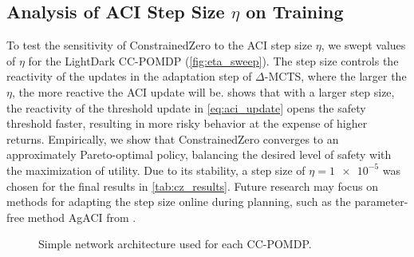 \subsection{Analysis of ACI Step Size \texorpdfstring{$\eta$}{η} on Training}

To test the sensitivity of ConstrainedZero to the ACI step size $\eta$, we swept values of $\eta$ for the LightDark CC-POMDP (\cref{fig:eta_sweep}).
The step size controls the reactivity of the updates in the adaptation step of $\Delta$-MCTS, where the larger the $\eta$, the more reactive the ACI update will be.
 shows that with a larger step size, the reactivity of the threshold update in \cref{eq:aci_update} opens the safety threshold faster, resulting in more risky behavior at the expense of higher returns.
Empirically, we show that ConstrainedZero converges to an approximately Pareto-optimal policy, balancing the desired level of safety with the maximization of utility.
Due to its stability, a step size of $\eta = \num{1e-5}$ was chosen for the final results in \cref{tab:cz_results}.
Future research may focus on methods for adapting the step size online during planning, such as the parameter-free method AgACI from \textcite{zaffran2022adaptive}.


\begin{figure}[t]
    \centering
    \caption{Simple network architecture used for each CC-POMDP.}
    \label{fig:nn_arch}
\end{figure}


